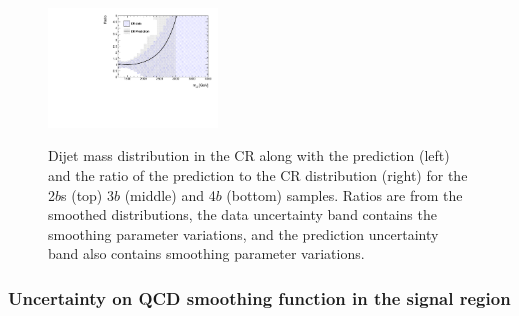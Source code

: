 \begin{figure}[htbp!]
\begin{center}
\includegraphics[width=0.4\textwidth,angle=-90]{figures/boosted/Syst_Shape/QCDSysfitSmooth_ratio_44.pdf} \\
\caption{Dijet mass distribution in the CR along with the prediction (left) and the ratio of the prediction to the CR distribution (right)  for the 2$b$s (top) 3$b$ (middle) and 4$b$ (bottom) samples.  Ratios are from the smoothed distributions, the data uncertainty band contains the smoothing parameter variations, and the prediction uncertainty band also contains smoothing parameter variations.}
\label{fig:qcd_shape_fit}
\end{center}
\end{figure}



\clearpage
\subsubsection{Uncertainty on QCD smoothing function in the signal region}
\label{unc-smooth-qcd-in-sr}

